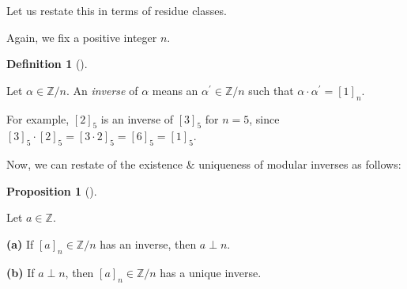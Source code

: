 \documentclass[numbers=enddot,12pt,final,onecolumn,notitlepage]{scrartcl}%
\numberwithin{exer}{subsection}
\theoremstyle{definition}
\newtheorem{prop}[theo]{Proposition}
\newenvironment{proposition}[1][]
{\begin{prop}[#1]\begin{leftbar}}
{\end{leftbar}\end{prop}}
\newtheorem{defi}[theo]{Definition}
\newenvironment{definition}[1][]
{\begin{defi}[#1]\begin{leftbar}}
{\end{leftbar}\end{defi}}
\begin{document}
Let us restate this in terms of residue classes.

Again, we fix a positive integer $n$.

\begin{definition}
Let $\alpha\in\mathbb{Z}/n$. An \textit{inverse} of $\alpha$ means an
$\alpha^{\prime}\in\mathbb{Z}/n$ such that $\alpha\cdot\alpha^{\prime}=\left[
1\right]  _{n}$.
\end{definition}

For example, $\left[  2\right]  _{5}$ is an inverse of $\left[  3\right]
_{5}$ for $n=5$, since $\left[  3\right]  _{5}\cdot\left[  2\right]
_{5}=\left[  3\cdot2\right]  _{5}=\left[  6\right]  _{5}=\left[  1\right]
_{5}$.

Now, we can restate of the existence \& uniqueness of modular inverses as follows:

\begin{proposition}
Let $a\in\mathbb{Z}$.

\textbf{(a)} If $\left[  a\right]  _{n}\in\mathbb{Z}/n$ has an inverse, then
$a\perp n$.

\textbf{(b)} If $a\perp n$, then $\left[  a\right]  _{n}\in\mathbb{Z}/n$ has a
unique inverse.
\end{proposition}
\end{document}
